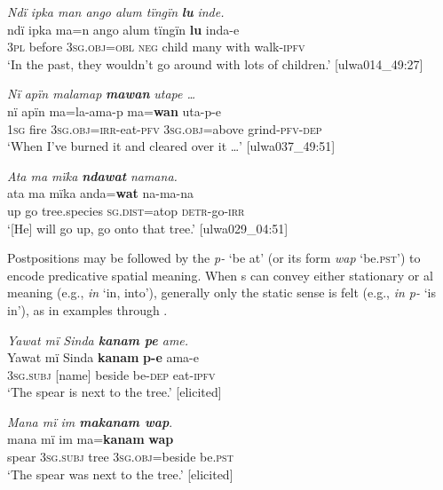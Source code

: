 \ea%
    \label{ex:otherwc:19}
          \textit{Ndï ipka man ango alum tïngïn} \textbf{\textit{lu}} \textit{inde.}\\
\gll    ndï  ipka  ma=n      ango  alum  tïngïn  \textbf{lu}    inda-e\\
    3\textsc{pl}  before  3\textsc{sg.obj=obl}  \textsc{neg}  child  many  with  walk-\textsc{ipfv}\\
\glt `In the past, they wouldn’t go around with lots of children.’ [ulwa014\_49:27]
\z

\ea%
    \label{ex:otherwc:20}
          \textit{Nï apïn malamap} \textbf{\textit{mawan}} \textit{utape …}\\
\gll    nï    apïn  ma=la{}-ama-p      ma=\textbf{wan} uta-p-e\\
    1\textsc{sg}  fire    3\textsc{sg.obj}=\textsc{irr}{}-eat-\textsc{pfv}  3\textsc{sg.obj}=above    grind-\textsc{pfv-dep}\\
\glt `When I’ve burned it and cleared over it …’ [ulwa037\_49:51]
\z

\ea%
    \label{ex:otherwc:21}
          \textit{Ata ma mïka} \textbf{\textit{ndawat}} \textit{namana.}\\
\gll    ata  ma  mïka  anda=\textbf{wat}    na-ma-na\\
    up  go  tree.species  \textsc{sg.dist}=atop  \textsc{detr-}go-\textsc{irr}\\
\glt `[He] will go up, go onto that tree.’ [ulwa029\_04:51]
\z

Postpositions may be followed by the  \textit{p-} ‘be at’ (or its   form \textit{wap} ‘be.\textsc{pst}’) to encode predicative spatial meaning. When s can convey either stationary or al meaning (e.g., \textit{in} ‘in, into’), generally only the static sense is felt (e.g., \textit{in p-} ‘is in’), as in examples  through .

\ea%
    \label{ex:otherwc:22}
          \textit{Yawat mï Sinda \textbf{kanam pe} ame.}\\
\gll    Yawat  mï      Sinda  \textbf{kanam}    \textbf{p-e}    ama-e\\
    [name]  3\textsc{sg.subj}  [name]  beside    be-\textsc{dep}  eat-\textsc{ipfv}\\
\glt `The spear is next to the tree.’ [elicited]
\z

\ea%
    \label{ex:otherwc:23}
          \textit{Mana mï im \textbf{makanam wap}}.\\
\gll mana  mï      im    ma=\textbf{kanam}    \textbf{wap}\\
    spear  3\textsc{sg.subj}  tree  3\textsc{sg.obj}=beside  be.\textsc{pst}\\
\glt `The spear was next to the tree.’ [elicited]
\z

